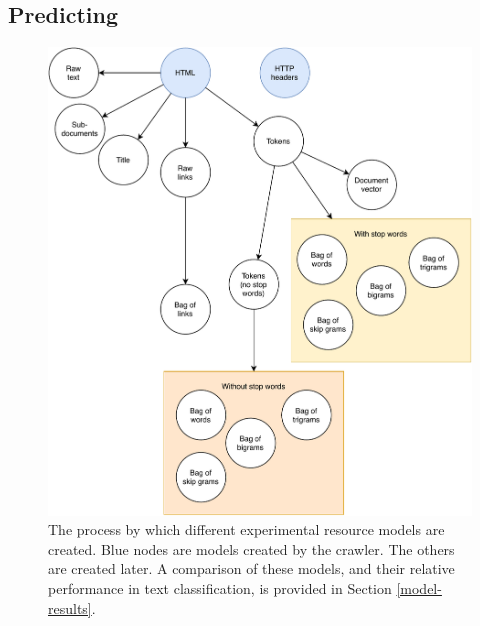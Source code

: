 \subsection{Predicting\label{predicting}}
\begin{figure}
    \centering
    \includegraphics[width=\textwidth]{media/formats}
    \caption{
        The process by which different experimental
        resource models are created.  Blue nodes are models 
        created by the crawler.  The others are
        created later. A comparison of these models, and their
        relative performance in text classification, is
        provided in Section \ref{model-results}.
    }
\end{figure}

